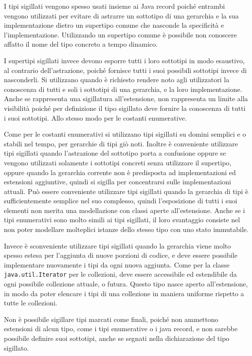 \documentclass{article}
\numberwithin{equation}{subsection}
\begin{document}
I tipi sigillati vengono spesso usati insieme ai Java record poiché entrambi vengono utilizzati per evitare di astrarre un sottotipo di una gerarchia e la sua implementazione dietro un supertipo comune che 
nasconde la specificità e l'implementazione. Utilizzando un supertipo comune è possibile non conoscere affatto il nome del tipo concreto a tempo dinamico. 

I supertipi sigillati invece devono esporre tutti i loro sottotipi in modo esaustivo, al contrario dell'astrazione, poiché fornisce tutti i suoi possibili sottotipi invece di nasconderli. 
Si utilizzano quando è richiesto rendere noto agli utilizzatori la conoscenza di tutti e soli i sottotipi di una gerarchia, e la loro implementazione. Anche se rappresenta una sigillatura all'estensione, non 
rappresenta un limite alla visibilità poiché per definizione il tipo sigillato deve fornire la conoscenza di tutti i suoi sottotipi. Allo stesso modo per le costanti enumerative. 

Come per le costanti enumerativi si utilizzano tipi sigillati su domini semplici e o stabili nel tempo, per gerarchie di tipi giò noti. 
Inoltre è conveniente utilizzare tipi sigillati quando l'astrazione del sottotipo porta a confusione oppure se vengono utilizzati solamente i sottotipi concreti senza utilizzare il supertipo, oppure quando 
la gerarchia corrente non è predisposta ad implementazioni ed estensioni aggiuntive, quindi si sigilla per concentrarsi sulle implementazioni attuali. 
Può essere conveniente utilizzare tipi sigillati quando la gerarchia di tipi è sufficientemente semplice nel suo complesso, quindi l'esposizione di tutti i suoi elementi non merita una modellazione con 
classi aperte all'estensione. 
Anche se i tipi enumerativi sono molto simili ai tipi sigillati, il loro svantaggio consiste nel non poter modellare molteplici istanze dello stesso tipo con uno stato immutabile. 

Invece è sconveniente utilizzare tipi sigillati quando la gerarchia viene molto spesso estesa per l'aggiunta di nuove porzioni di codice, e deve essere possibile implementare nuovamente i tipi da ogni nuova 
aggiunta. Come per la classe \verb|java.util.Iterator| per le collezioni, deve essere accessibile ed estendibile da ogni possibile collezione attuale, o futura. Questo tipo nasce aperto all'estensione, in modo 
da poter elencare i tipi di una collezione in maniera uniforme rispetto a tutte le collezioni. 

Non è possibile sigillare tipi marcati come finali, poiché non ammettono estensioni di alcun tipo, come i tipi enumerative o i java record, e non sarebbe possibile definire suoi sottotipi, anche se segnati 
nella dichiarazione del tipo sigillato. 
\end{document}
